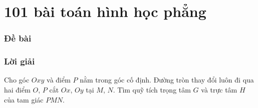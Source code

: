 \part{101 bài toán hình học phẳng}

\setcounter{section}{0}

    \section{Đề bài}

    \newpage

    \section{Lời giải}

        \begin{problem}
            Cho góc \(Oxy\) và điểm \(P\) nằm trong góc cố định. Đường tròn thay đổi luôn đi qua hai điểm \(O\), \(P\) cắt \(Ox\), \(Oy\) tại \(M\), \(N\). Tìm quỹ tích trọng tâm \(G\) và trực tâm \(H\) của tam giác \(PMN\).
        \end{problem}

